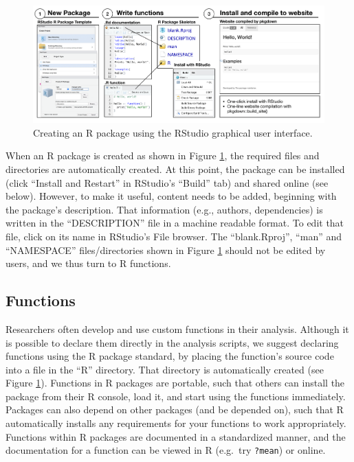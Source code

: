 \documentclass[
  english,
  jou,floatsintext]{apa6}
\begin{document}
\begin{figure}

{\centering \includegraphics[width=\textwidth]{images/r-package-skeleton} 

}

\caption{Creating an R package using the RStudio graphical user interface.}\label{fig:creating-package-rstudio}
\end{figure}

When an R package is created as shown in Figure \ref{fig:creating-package-rstudio}, the required files and directories are automatically created. At this point, the package can be installed (click ``Install and Restart'' in RStudio's ``Build'' tab) and shared online (see below). However, to make it useful, content needs to be added, beginning with the package's description. That information (e.g., authors, dependencies) is written in the ``DESCRIPTION'' file in a machine readable format. To edit that file, click on its name in RStudio's File browser. The ``blank.Rproj'', ``man'' and ``NAMESPACE'' files/directories shown in Figure \ref{fig:creating-package-rstudio} should not be edited by users, and we thus turn to R functions.

\hypertarget{functions}{%
\subsection{Functions}\label{functions}}

Researchers often develop and use custom functions in their analysis. Although it is possible to declare them directly in the analysis scripts, we suggest declaring functions using the R package standard, by placing the function's source code into a file in the ``R'' directory. That directory is automatically created (see Figure \ref{fig:creating-package-rstudio}). Functions in R packages are portable, such that others can install the package from their R console, load it, and start using the functions immediately. Packages can also depend on other packages (and be depended on), such that R automatically installs any requirements for your functions to work appropriately. Functions within R packages are documented in a standardized manner, and the documentation for a function can be viewed in R (e.g.~try \texttt{?mean}) or online.
\end{document}
